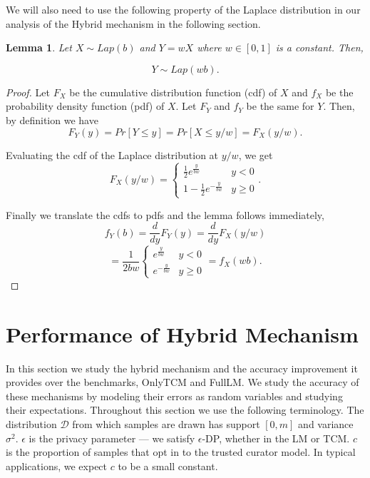 \documentclass{article}
\theoremstyle{plain}
\newtheorem{lem}[thm]{Lemma}
\begin{document}
We will also need to use the following property of the Laplace distribution in our analysis of the Hybrid mechanism in the following section. 

\begin{lem} \label{wtimeslap}
Let $X \sim Lap(b)$ and $Y = wX$ where $w \in [0,1]$ is a constant. Then, 

$$Y \sim Lap(wb).$$
\end{lem}

\begin{proof}
Let $F_X$ be the cumulative distribution function (cdf) of $X$ and $f_X$ be the probability density function (pdf) of $X$. Let $F_Y$ and $f_Y$ be the same for $Y$. Then, by definition we have 
$$F_Y(y) = Pr[Y \leq y] = Pr[X \leq y/w] = F_X(y/w).$$
	
Evaluating the cdf of the Laplace distribution at $y/w$, we get 
$$F_X(y/w) = 
	\begin{cases} 
      \frac{1}{2}e^{\frac{y}{bw}} & y < 0 \\
      1 - \frac{1}{2}e^{-\frac{y}{bw}} & y \geq 0 
	\end{cases} .$$
	
Finally we translate the cdfs to pdfs and the lemma follows immediately, 
$$f_Y(b) = \frac{d}{dy}F_Y(y) = \frac{d}{dy}F_X(y/w) $$
$$= \frac{1}{2bw}
	\begin{cases} 
      e^{\frac{y}{bw}} & y < 0 \\
      e^{-\frac{y}{bw}} & y \geq 0 
	\end{cases}
     = f_X(wb).$$
\end{proof}



\section{Performance of Hybrid Mechanism}

In this section we study the hybrid mechanism and the accuracy improvement it provides over the benchmarks, OnlyTCM and FullLM. We study the accuracy of these mechanisms by modeling their errors as random variables and studying their expectations. Throughout this section we use the following terminology. The distribution $\mathcal{D}$ from which samples are drawn has support $[0,m]$ and variance $\sigma^2$. $\epsilon$ is the privacy parameter — we satisfy $\epsilon$-DP, whether in the LM or TCM. $c$ is the proportion of samples that opt in to the trusted curator model. In typical applications, we expect $c$ to be a small constant. 
\end{document}
